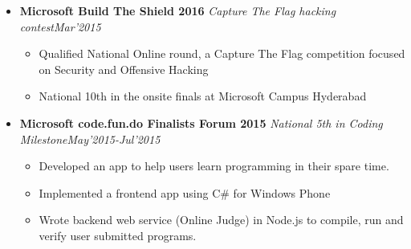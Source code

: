 \documentclass[11pt,a4paper]{moderncv}
\newcommand{\experience}[4]{
  \vspace{0.1cm}
\item \textbf{\large{#1}} \textit{#2}\hfill\textit{#3}
  \begin{itemize}[leftmargin=*]
    \setlength\itemsep{0em} #4
  \end{itemize}
}
\begin{document}
\begin{itemize}
  \experience{Microsoft Build The Shield 2016}{Capture The Flag
    hacking contest}{Mar'2015}{
  \item Qualified National Online round, a Capture The Flag
    competition focused on Security and Offensive Hacking
  \item National 10th in the onsite finals at Microsoft Campus Hyderabad
  }

  \experience{Microsoft code.fun.do Finalists Forum 2015}{National 5th in Coding Milestone}{May'2015-Jul'2015}{
  \item Developed an app to help users learn programming in their spare time.
  \item Implemented a frontend app using C\# for Windows Phone
  \item Wrote backend web service (Online Judge) in Node.js to compile, run and verify user submitted programs.
  }
\end{itemize}
\end{document}
